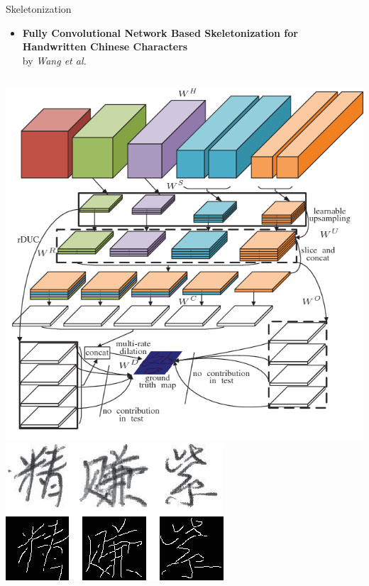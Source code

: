 \documentclass[aspectratio=169]{beamer}
\begin{document}
\begin{frame}{Skeletonization}
\begin{itemize}
\item \textbf{Fully Convolutional Network Based Skeletonization for Handwritten Chinese Characters}\\by \emph{Wang et al.}
\end{itemize}
\begin{columns}
\includegraphics[scale=0.22]{pics/chCharPipe.png}
\includegraphics[scale=0.5]{pics/chCharExamples.png}
\end{columns}

\end{frame}
\end{document}
